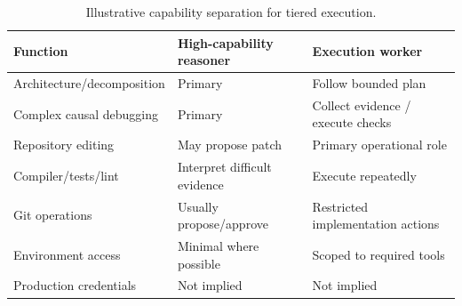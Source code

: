 \begin{table}[htbp]
\centering
\small
\caption{Illustrative capability separation for tiered execution.}
\label{tab:reasoner-executor}
\begin{tabularx}{\textwidth}{@{}lX X@{}}
\toprule
Function & High-capability reasoner & Execution worker \\
\midrule
Architecture/decomposition & Primary & Follow bounded plan \\
Complex causal debugging & Primary & Collect evidence / execute checks \\
Repository editing & May propose patch & Primary operational role \\
Compiler/tests/lint & Interpret difficult evidence & Execute repeatedly \\
Git operations & Usually propose/approve & Restricted implementation actions \\
Environment access & Minimal where possible & Scoped to required tools \\
Production credentials & Not implied & Not implied \\
\bottomrule
\end{tabularx}
\end{table}
